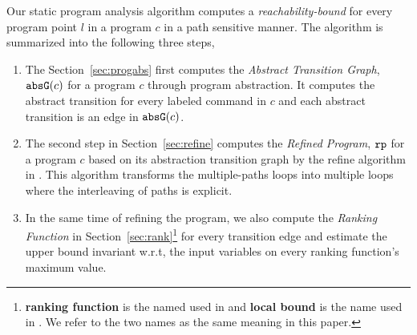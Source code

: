 Our static program analysis algorithm computes 
a \emph{reachability-bound} for every program point $l$ in a program $c$ in a path sensitive manner.
The algorithm is summarized into the following three steps,
\begin{enumerate}
\item  The Section~\ref{sec:progabs} first 
computes the \emph{Abstract Transition Graph}, $\mathtt{abs}{\mathtt{G}}(c)$ for a program $c$ through program abstraction.
It computes the abstract transition 
for every labeled command in $c$ and each abstract transition is an edge in $\mathtt{abs}{\mathtt{G}}(c)$.
\item The second step in Section~\ref{sec:refine}
computes the \emph{Refined Program}, $\mathtt{rp}$ for a program $c$ based on 
its abstraction transition graph by the refine algorithm in \cite{GulwaniJK09}.
This algorithm transforms the multiple-paths loops
into multiple loops where
the interleaving of paths is explicit.
\item In the same time of refining the program, we also compute the \emph{Ranking Function} in Section~\ref{sec:rank}\footnote{\textbf{ranking function} is the named used in \cite{SinnZV14}
and \textbf{local bound} is the name used in \cite{ZulegerGSV11,SinnZV17}.
We refer to the two names as the same meaning in this paper.}  for every transition edge 
and estimate the upper bound invariant w.r.t, the input variables on every ranking function's maximum value.


\end{enumerate}
